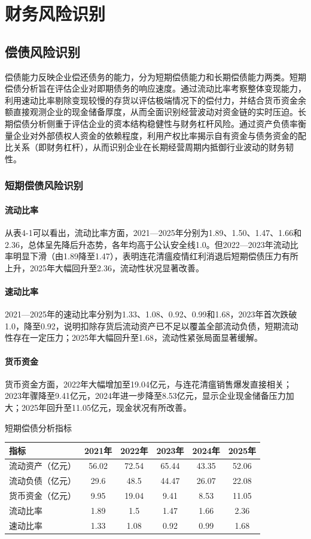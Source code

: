 \documentclass[12pt,a4paper,fontset=windows,UTF8]{ctexart}
\begin{document}
\section{财务风险识别}
\subsection{偿债风险识别}
偿债能力反映企业偿还债务的能力，分为短期偿债能力和长期偿债能力两类。短期偿债分析旨在评估企业对即期债务的响应速度。通过流动比率考察整体变现能力，利用速动比率剔除变现较慢的存货以评估极端情况下的偿付力，并结合货币资金余额直接观测企业的现金储备厚度，从而全面识别经营波动对资金链的实时压迫。长期偿债分析侧重于评估企业的资本结构稳健性与财务杠杆风险。通过资产负债率衡量企业对外部债权人资金的依赖程度，利用产权比率揭示自有资金与债务资金的配比关系（即财务杠杆），从而识别企业在长期经营周期内抵御行业波动的财务韧性。

\subsubsection{短期偿债风险识别}
\paragraph*{流动比率}
从表4-1可以看出，流动比率方面，2021—2025年分别为1.89、1.50、1.47、1.66和2.36，总体呈先降后升态势，各年均高于公认安全线1.0。但2022—2023年流动比率明显下滑（由1.89降至1.47），表明连花清瘟疫情红利消退后短期偿债压力有所上升，2025年大幅回升至2.36，流动性状况显著改善。

\paragraph*{速动比率}
2021—2025年的速动比率分别为1.33、1.08、0.92、0.99和1.68，2023年首次跌破1.0，降至0.92，说明扣除存货后流动资产已不足以覆盖全部流动负债，短期流动性存在一定压力；2025年大幅回升至1.68，流动性紧张局面显著缓解。

\paragraph*{货币资金}
货币资金方面，2022年大幅增加至19.04亿元，与连花清瘟销售爆发直接相关；2023年骤降至9.41亿元，2024年进一步降至8.53亿元，显示企业现金储备压力加大；2025年回升至11.05亿元，现金状况有所改善。

\begin{thesTab}[htbp]{短期偿债分析指标\label{tab:t1}}{}
\begin{tabularx}{\linewidth}{X c c c c c}
  \toprule
  指标 & 2021年 & 2022年 & 2023年 & 2024年 & 2025年 \\
  \midrule
  流动资产（亿元） & 56.02 & 72.54 & 65.44 & 43.35 & 52.06 \\
  流动负债（亿元） & 29.6 & 48.5 & 44.47 & 26.07 & 22.08 \\
  货币资金（亿元） & 9.95 & 19.04 & 9.41 & 8.53 & 11.05 \\
  流动比率 & 1.89 & 1.5 & 1.47 & 1.66 & 2.36 \\
  速动比率 & 1.33 & 1.08 & 0.92 & 0.99 & 1.68 \\
  \bottomrule
\end{tabularx}
\end{thesTab}
\end{document}
